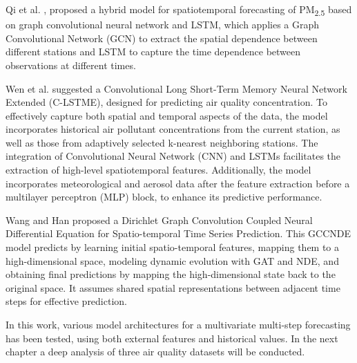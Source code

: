 \noindent Qi et al. \cite{graphlstm1}, proposed a hybrid model for spatiotemporal forecasting of PM\textsubscript{2.5} based on graph convolutional neural network and LSTM, which applies a Graph Convolutional Network (GCN) to extract the spatial dependence between different stations and LSTM to capture the time dependence between observations at different times. 

\noindent Wen et al. \cite{WEN20191091} suggested a Convolutional Long Short-Term Memory Neural Network Extended (C-LSTME), designed for predicting air quality concentration. To effectively capture both spatial and temporal aspects of the data, the model incorporates historical air pollutant concentrations from the current station, as well as those from adaptively selected k-nearest neighboring stations. The integration of Convolutional Neural Network (CNN) and LSTMs facilitates the extraction of high-level spatiotemporal features. Additionally, the model incorporates meteorological and aerosol data after the feature extraction before a multilayer perceptron (MLP) block, to enhance its predictive performance.

\noindent Wang and Han \cite{Wang2023} proposed a Dirichlet Graph Convolution Coupled Neural Differential Equation for Spatio-temporal Time Series Prediction. This GCCNDE model predicts by learning initial spatio-temporal features, mapping them to a high-dimensional space, modeling dynamic evolution with GAT and NDE, and obtaining final predictions by mapping the high-dimensional state back to the original space. It assumes shared spatial representations between adjacent time steps for effective prediction.

In this work, various model architectures for a multivariate multi-step forecasting has been tested, using both external features and historical values. In the next chapter a deep analysis of three air quality datasets will be conducted.
\newpage


















